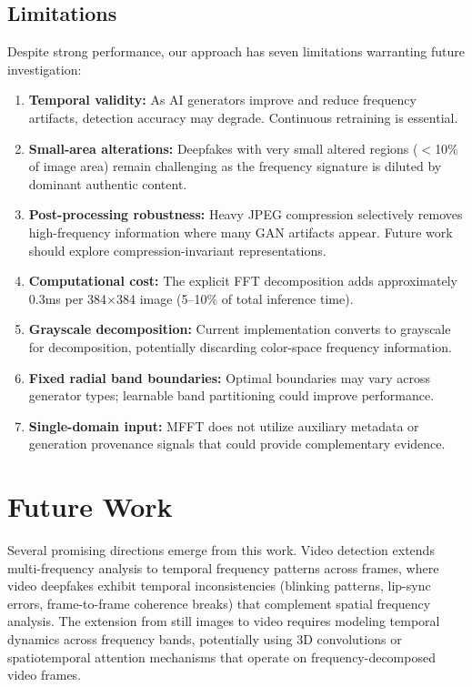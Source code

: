 \documentclass[journal]{IEEEtran}
\begin{document}
\subsection{Limitations}
Despite strong performance, our approach has seven limitations warranting future investigation:
\begin{enumerate}
    \item \textbf{Temporal validity:} As AI generators improve and reduce frequency artifacts, detection accuracy may degrade. Continuous retraining is essential.
    \item \textbf{Small-area alterations:} Deepfakes with very small altered regions ($<$10\% of image area) remain challenging as the frequency signature is diluted by dominant authentic content.
    \item \textbf{Post-processing robustness:} Heavy JPEG compression selectively removes high-frequency information where many GAN artifacts appear. Future work should explore compression-invariant representations.
    \item \textbf{Computational cost:} The explicit FFT decomposition adds approximately 0.3ms per 384$\times$384 image (5--10\% of total inference time).
    \item \textbf{Grayscale decomposition:} Current implementation converts to grayscale for decomposition, potentially discarding color-space frequency information.
    \item \textbf{Fixed radial band boundaries:} Optimal boundaries may vary across generator types; learnable band partitioning could improve performance.
    \item \textbf{Single-domain input:} MFFT does not utilize auxiliary metadata or generation provenance signals that could provide complementary evidence.
\end{enumerate}

\section{Future Work}
Several promising directions emerge from this work. Video detection extends multi-frequency analysis to temporal frequency patterns across frames, where video deepfakes exhibit temporal inconsistencies (blinking patterns, lip-sync errors, frame-to-frame coherence breaks) that complement spatial frequency analysis. The extension from still images to video requires modeling temporal dynamics across frequency bands, potentially using 3D convolutions or spatiotemporal attention mechanisms that operate on frequency-decomposed video frames.
\end{document}
